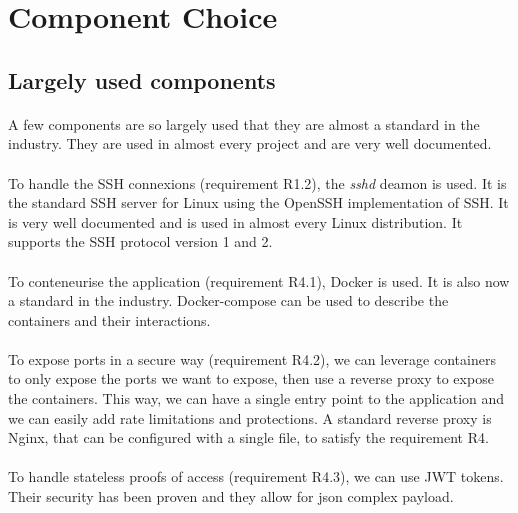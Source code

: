 \section{Component Choice}

\subsection{Largely used components}

\paragraph{}
A few components are so largely used that they are almost a standard in the industry. They are used in almost every project and are very well documented. 

\paragraph{}
To handle the SSH connexions (requirement R1.2), the \textit{sshd} deamon is used. It is the standard SSH server for Linux using the OpenSSH implementation of SSH. It is very well documented and is used in almost every Linux distribution. It supports the SSH protocol version 1 and 2. 

\paragraph{}
To conteneurise the application (requirement R4.1), Docker is used. It is also now a standard in the industry. Docker-compose can be used to describe the containers and their interactions. 

\paragraph{}
To expose ports in a secure way (requirement R4.2), we can leverage containers to only expose the ports we want to expose, then use a reverse proxy to expose the containers. This way, we can have a single entry point to the application and we can easily add rate limitations and protections. A standard reverse proxy is Nginx, that can be configured with a single file, to satisfy the requirement R4.

\paragraph{}
To handle stateless proofs of access (requirement R4.3), we can use JWT tokens. Their security has been proven and they allow for json complex payload.

